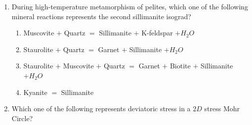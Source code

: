 \documentclass[journal,12pt,onecolumn]{IEEEtran}
\theoremstyle{remark}
\begin{document}
\begin{enumerate}
\begin{multicols}{2}
            \underline{\textbf{Group $II$}}
            \begin{enumerate}
                \item Periproct
                \item Hypostome
                \item Deltidial plate
                \item Lunule
            \end{enumerate}
        \end{multicols}
\begin{enumerate}
\end{enumerate}
\hfill{}

\item During high-temperature metamorphism of pelites, which one of the following mineral reactions represents the second sillimanite isograd?
\begin{enumerate}
    \item Muscovite $+$ Quartz $=$ Sillimanite $+$ K-feldspar $+ H_2O$
    \item Staurolite $+$ Quartz $=$ Garnet $+$ Sillimanite $+ H_2O$
    \item Staurolite $+$ Muscovite $+$ Quartz $=$ Garnet $+$ Biotite $+$ Sillimanite $+ H_2O$
    \item Kyanite $=$ Sillimanite
\end{enumerate}
\hfill{}

\item Which one of the following represents deviatoric stress in a $2D$ stress Mohr Circle?
\begin{enumerate}
\end{enumerate}
\hfill{}


\end{enumerate}
\end{document}
